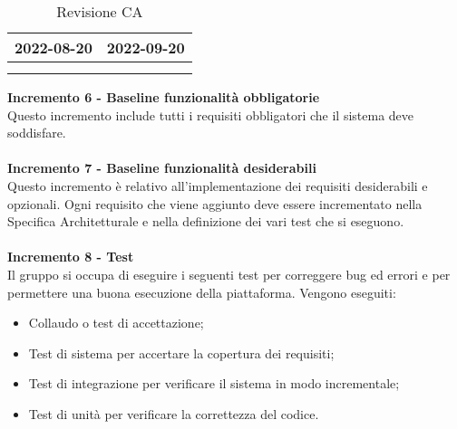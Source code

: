 {{{\begin{longtable}{C{.4\freewidth} C{.4\freewidth}}
        2022-08-20 & 2022-09-20 \\
        \bottomrule
        \\
        \caption{Revisione CA}
        \end{longtable}
        
        
    \textbf{Incremento 6 - Baseline funzionalità obbligatorie} \\
    Questo incremento include tutti i requisiti obbligatori che il sistema deve soddisfare.\\ \\
    \textbf{Incremento 7 - Baseline funzionalità desiderabili} \\ 
    Questo incremento è relativo all'implementazione dei requisiti desiderabili e opzionali. Ogni requisito che viene aggiunto deve essere incrementato nella Specifica Architetturale e nella definizione dei vari test che si eseguono. \\ \\
    \textbf{Incremento 8 - Test} \\ 
    Il gruppo si occupa di eseguire i  seguenti test  per correggere bug ed errori e per permettere una buona esecuzione della piattaforma. Vengono eseguiti:
    \begin{itemize}
        \item Collaudo o test di accettazione;
        \item Test di sistema per accertare la copertura dei requisiti;
        \item Test di integrazione per verificare il sistema in modo incrementale;
        \item Test di unità per verificare la correttezza del codice.
    \end{itemize} 
    }

}
}
